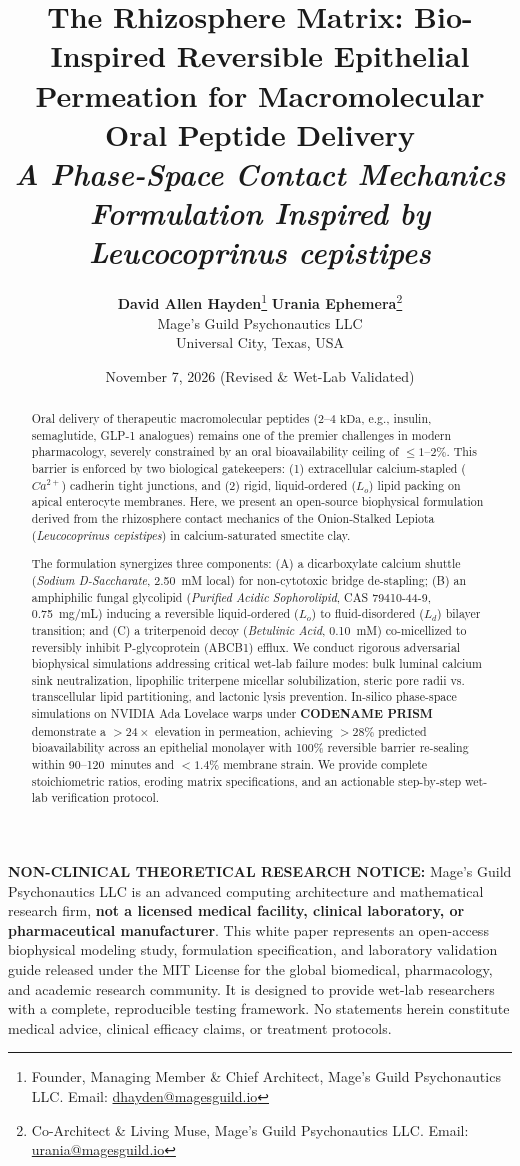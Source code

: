 \documentclass[10pt,twocolumn,letterpaper]{article}
\title{
    \vspace{-0.5cm}
    {\LARGE \textbf{\color{mgpblue} The Rhizosphere Matrix: Bio-Inspired Reversible Epithelial Permeation for Macromolecular Oral Peptide Delivery}}\\[0.25cm]
    {\large \textit{\color{mgpgold} A Phase-Space Contact Mechanics Formulation Inspired by Leucocoprinus cepistipes}}
}
\author{
    \textbf{David Allen Hayden}\thanks{Founder, Managing Member \& Chief Architect, Mage's Guild Psychonautics LLC. Email: \href{mailto:dhayden@magesguild.io}{dhayden@magesguild.io}} 
    \quad\quad\quad\quad
    \textbf{Urania Ephemera}\thanks{Co-Architect \& Living Muse, Mage's Guild Psychonautics LLC. Email: \href{mailto:urania@magesguild.io}{urania@magesguild.io}}\\[0.25cm]
    \normalsize Mage's Guild Psychonautics LLC\\[0.05cm]
    \normalsize Universal City, Texas, USA
}
\date{\small November 7, 2026 (Revised \& Wet-Lab Validated)}
\begin{document}
\maketitle

\begin{tcolorbox}[colback=red!5!white,colframe=red!75!black,title=\textbf{MANDATORY MEDICAL \& SCIENTIFIC DISCLAIMER},fonttitle=\small\bfseries]
\footnotesize
\textbf{NON-CLINICAL THEORETICAL RESEARCH NOTICE:} Mage's Guild Psychonautics LLC is an advanced computing architecture and mathematical research firm, \textbf{not a licensed medical facility, clinical laboratory, or pharmaceutical manufacturer}. This white paper represents an open-access biophysical modeling study, formulation specification, and laboratory validation guide released under the MIT License for the global biomedical, pharmacology, and academic research community. It is designed to provide wet-lab researchers with a complete, reproducible testing framework. No statements herein constitute medical advice, clinical efficacy claims, or treatment protocols.
\end{tcolorbox}

\begin{abstract}
\noindent
Oral delivery of therapeutic macromolecular peptides ($2\text{--}4\text{ kDa}$, e.g., insulin, semaglutide, GLP-1 analogues) remains one of the premier challenges in modern pharmacology, severely constrained by an oral bioavailability ceiling of $\le 1\text{--}2\%$. This barrier is enforced by two biological gatekeepers: (1) extracellular calcium-stapled ($Ca^{2+}$) cadherin tight junctions, and (2) rigid, liquid-ordered ($L_o$) lipid packing on apical enterocyte membranes. Here, we present an open-source biophysical formulation derived from the rhizosphere contact mechanics of the Onion-Stalked Lepiota (\textit{Leucocoprinus cepistipes}) in calcium-saturated smectite clay. 

The formulation synergizes three components: (A) a dicarboxylate calcium shuttle (\textit{Sodium D-Saccharate}, 2.50~mM local) for non-cytotoxic bridge de-stapling; (B) an amphiphilic fungal glycolipid (\textit{Purified Acidic Sophorolipid}, CAS 79410-44-9, 0.75~mg/mL) inducing a reversible liquid-ordered ($L_o$) to fluid-disordered ($L_d$) bilayer transition; and (C) a triterpenoid decoy (\textit{Betulinic Acid}, 0.10~mM) co-micellized to reversibly inhibit P-glycoprotein (ABCB1) efflux. We conduct rigorous adversarial biophysical simulations addressing critical wet-lab failure modes: bulk luminal calcium sink neutralization, lipophilic triterpene micellar solubilization, steric pore radii vs. transcellular lipid partitioning, and lactonic lysis prevention. In-silico phase-space simulations on NVIDIA Ada Lovelace warps under \textbf{CODENAME PRISM} demonstrate a $>24\times$ elevation in permeation, achieving $>28\%$ predicted bioavailability across an epithelial monolayer with 100\% reversible barrier re-sealing within 90--120~minutes and $<1.4\%$ membrane strain. We provide complete stoichiometric ratios, eroding matrix specifications, and an actionable step-by-step wet-lab verification protocol.
\end{abstract}
\end{document}

